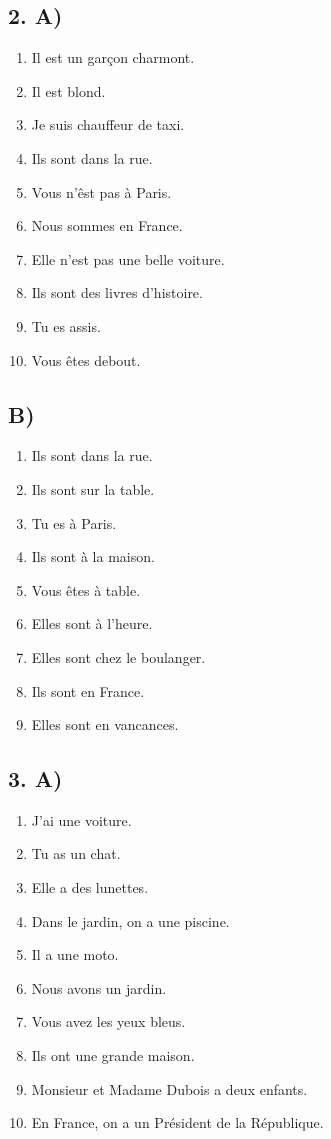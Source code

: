 \subsection*{2. A)}

\begin{enumerate}
    \item Il est un garçon charmont.
    \item Il est blond.
    \item Je suis chauffeur de taxi.
    \item Ils sont dans la rue.
    \item Vous n'êst pas à Paris.
    \item Nous sommes en France.
    \item Elle n'est pas une belle voiture.
    \item Ils sont des livres d'histoire.
    \item Tu es assis.
    \item Vous êtes debout.
\end{enumerate}

\subsection*{B)}

\begin{enumerate}
    \item Ils sont dans la rue.
    \item Ils sont sur la table.
    \item Tu es à Paris.
    \item Ils sont à la maison.
    \item Vous êtes à table.
    \item Elles sont à l'heure.
    \item Elles sont chez le boulanger.
    \item Ils sont en France.
    \item Elles sont en vancances.
\end{enumerate}

\subsection*{3. A)}

\begin{enumerate}
    \item J'ai une voiture.
    \item Tu as un chat.
    \item Elle a des lunettes.
    \item Dans le jardin, on a une piscine.
    \item Il a une moto.
    \item Nous avons un jardin.
    \item Vous avez les yeux bleus.
    \item Ils ont une grande maison.
    \item Monsieur et Madame Dubois a deux enfants.
    \item En France, on a un Président de la République.
\end{enumerate}
